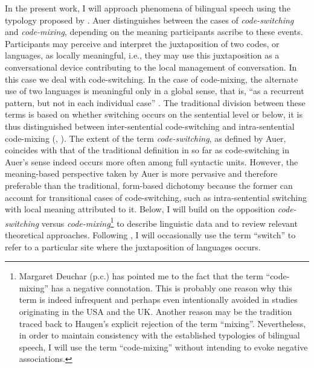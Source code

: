 In the present work, I will approach phenomena of bilingual speech using the typology proposed by \citet{auer-codeswitching-1999}. Auer distinguishes between the cases of \textit{code-switching} and \textit{code-mixing}, depending on the meaning participants ascribe to these events. Participants may perceive and interpret the juxtaposition of two codes, or languages, as locally meaningful, i.e., they may use this juxtaposition as a conversational device contributing to the local management of conversation. In this case  we deal with code-switching. In the case of code-mixing,  the alternate use of two languages is meaningful only in a global sense, that is, ``as a recurrent pattern, but not in each individual case'' \citep[467]{wodak-code-switching-2011}. The traditional division between these terms is based on whether switching occurs on the sentential level or below, it is thus distinguished between inter-sentential code-switching and intra-sentential code-mixing (\citealt[cf.][467]{wodak-code-switching-2011}, \citealt[70--73]{clyne-dynamics-2003}). The extent of the term \textit{code-switching}, as defined by Auer, coincides with that of the traditional definition in so far as code-switching in Auer's sense indeed occurs more often among full syntactic units. However, the meaning-based perspective taken by Auer is more pervasive and therefore  preferable than the traditional, form-based dichotomy because the former can account for transitional cases of code-switching, such as intra-sentential switching with local meaning attributed to it. Below, I will build on the opposition \textit{code-switching} versus \textit{code-mixing}\footnote{Margaret Deuchar (p.c.) has pointed me to the fact that the term ``code-mixing'' has a negative connotation. This is probably one reason why this term is indeed infrequent and perhaps even intentionally avoided in studies originating in the USA and the UK. Another reason may be the tradition traced back to Haugen's explicit rejection of the term ``mixing''. Nevertheless, in order to maintain consistency with the established typologies of bilingual speech, I will use the term ``code-mixing'' without intending to evoke negative associations.}
to describe linguistic data and to review relevant theoretical approaches. Following \citet{muysken-bilingual-2000}, I will occasionally use the term ``switch'' to refer to a particular site where the juxtaposition of languages occurs.


